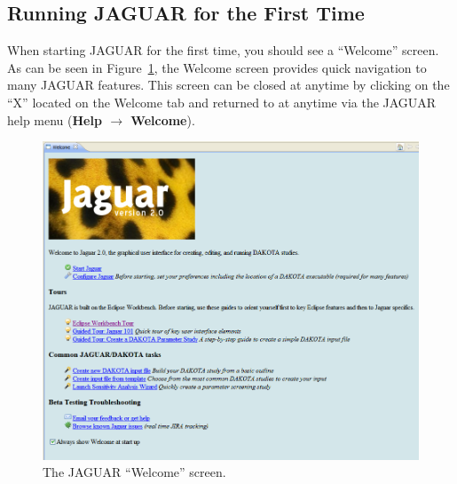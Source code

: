 \subsection{Running JAGUAR for the First Time}

When starting JAGUAR for the first time, you should see a ``Welcome''
screen.  As can be seen in Figure~\ref{fig:input:jag_welcome}, the
Welcome screen provides quick navigation to many JAGUAR features.
This screen can be closed at anytime by clicking on the ``X'' located
on the Welcome tab and returned to at anytime via the JAGUAR help menu
({\bf Help $\rightarrow$ Welcome}).
\begin{figure}
  \centering
  \includegraphics[scale=0.4]{images/jag_welcome}
  \caption{The JAGUAR ``Welcome'' screen.}
  \label{fig:input:jag_welcome}
\end{figure}

